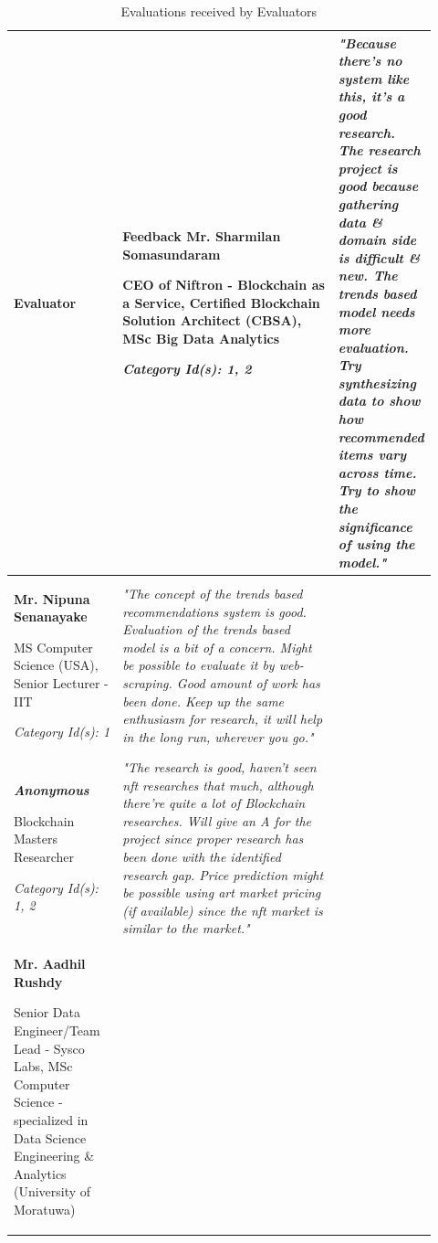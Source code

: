 \begin{longtable}{|p{0.27\linewidth}|p{0.655\linewidth}|}
\caption{Evaluations received by Evaluators}
\label{tab:evaluators-eval-feedback}
\\
\hline
\textbf{Evaluator} & \textbf{Feedback} \endfirsthead
\hline
\textbf{Mr. Sharmilan Somasundaram}

CEO of Niftron - Blockchain as a Service, Certified Blockchain Solution Architect (CBSA), MSc Big Data Analytics

\textit{Category Id(s): 1, 2}
&  
\textit{"Because there's no system like this, it's a good research. The research project is good because gathering data \& domain side is difficult \& new.
The trends based model needs more evaluation. Try synthesizing data to show how recommended items vary across time. Try to show the significance of using the model."}
\\
\hline
\textbf{Mr. Nipuna Senanayake} 

MS Computer Science (USA), Senior Lecturer - IIT

\textit{Category Id(s): 1}
& 
\textit{"The concept of the trends based recommendations system is good. Evaluation of the trends based model is a bit of a concern. Might be possible to evaluate it by web-scraping.
Good amount of work has been done. Keep up the same enthusiasm for research, it will help in the long run, wherever you go."}
 \\
\hline
\textbf{\textit{Anonymous}}

Blockchain Masters Researcher 

\textit{Category Id(s): 1, 2}
& 
\textit{"The research is good, haven't seen \gls{nft} researches that much, although there're quite a lot of Blockchain researches. Will give an A for the project since proper research has been done with the identified research gap.
Price prediction might be possible using art market pricing (if available) since the \gls{nft} market is similar to the market."}
\\
\hline
\textbf{Mr. Aadhil Rushdy}

Senior Data Engineer/Team Lead - Sysco Labs, MSc Computer Science - specialized in Data Science Engineering \& Analytics (University of Moratuwa)


\end{longtable}
